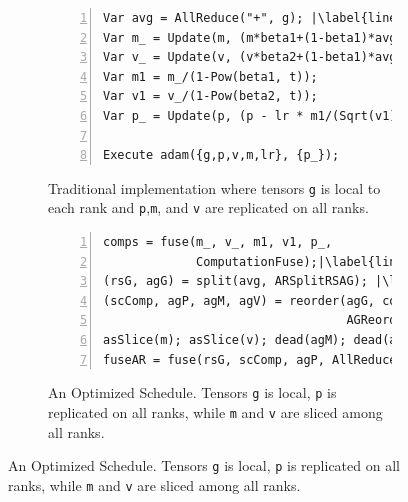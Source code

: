 \begin{figure}
  \small
  \centering
  \begin{subfigure}[t]{\columnwidth}
\begin{lstlisting}[language=DSL, numbers=left]
Var avg = AllReduce("+", g); |\label{line:adam:avg}|
Var m_ = Update(m, (m*beta1+(1-beta1)*avg));|\label{line:adam:pointwise-begin}||\label{line:update:m}|
Var v_ = Update(v, (v*beta2+(1-beta1)*avg*avg));|\label{line:update:v}|
Var m1 = m_/(1-Pow(beta1, t));
Var v1 = v_/(1-Pow(beta2, t));
Var p_ = Update(p, (p - lr * m1/(Sqrt(v1))));|\label{line:adam:pointwise-end}|

Execute adam({g,p,v,m,lr}, {p_});
\end{lstlisting}
\caption{Traditional implementation where 
               tensors \texttt{g} is local to each rank and \texttt{p},\texttt{m}, and \texttt{v} are replicated on all ranks.}
\label{fig:traditional-adam}
\end{subfigure}
\par\bigskip %
\begin{subfigure}[b]{\columnwidth}
\begin{lstlisting}[language=DSL, numbers=left]
comps = fuse(m_, v_, m1, v1, p_, 
             ComputationFuse);|\label{line:adam-schedule:fuse-comp}|
(rsG, agG) = split(avg, ARSplitRSAG); |\label{line:adam-schedule:split}|
(scComp, agP, agM, agV) = reorder(agG, comps, 
                                  AGReorder);|\label{line:adam-schedule:reorder}|  
asSlice(m); asSlice(v); dead(agM); dead(agV); |\label{line:adam-schedule:slice-m-v}| |\label{line:adam-schedule:remove-m-v-allgather}|
fuseAR = fuse(rsG, scComp, agP, AllReduceFuse);|\label{line:adam-schedule:fuse-allreduce}|
\end{lstlisting}
\caption{An Optimized Schedule. Tensors \texttt{g} is local, \texttt{p} is replicated on all ranks, while 
\texttt{m} and \texttt{v} are sliced among all ranks.}
\label{fig:adam-schedule}
\end{subfigure}


\end{figure}

